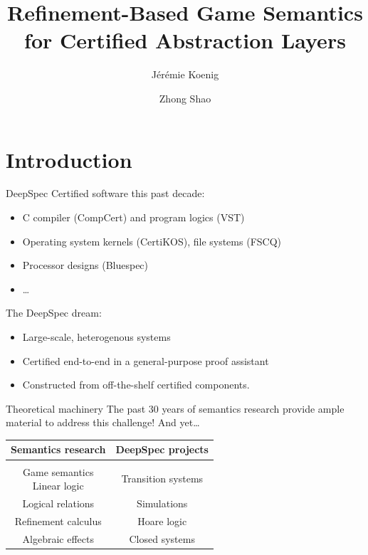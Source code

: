 \documentclass{beamer}
\title{Refinement-Based Game Semantics for
  Certified Abstraction Layers}
\author{J\'er\'emie Koenig \and Zhong Shao}
\begin{document}
\begin{frame}
\titlepage
\end{frame}

\section{Introduction} %

\begin{frame}{DeepSpec} %
  Certified software this past decade:
  \begin{itemize}
    \item C compiler (CompCert) and program logics (VST)
    \item Operating system kernels (CertiKOS), file systems (FSCQ)
    \item Processor designs (Bluespec)
    \item \ldots
  \end{itemize}

  \pause
  The DeepSpec dream:
  \begin{itemize}
    \item Large-scale, heterogenous systems
    \item Certified end-to-end in a general-purpose proof assistant
    \item Constructed from off-the-shelf certified components.
  \end{itemize}
\end{frame}

\begin{frame}{Theoretical machinery} %
  The past 30 years of semantics research
  provide ample material to address this challenge!
  And yet\ldots

  \pause
  \vfill
  \begin{centering}
    \begin{tabular}{cc}
      \hline
      Semantics research &
      DeepSpec projects
      \\
      \hline
      \\
      \pause
      \parbox{.45\textwidth}{
        \centering
        Game semantics \\ Linear logic
      } &
      \pause
      \parbox{.45\textwidth}{
        \centering
        Transition systems
      } \\[1.5em]
      \pause
      Logical relations &
      \pause
      Simulations \\[1.5em]
      \pause
      Refinement calculus &
      \pause
      Hoare logic \\[1.5em]
      \pause
      Algebraic effects &
      \pause
      Closed systems \pause \\[1.5em]
      \hline
    \end{tabular}
  \end{centering}
\end{frame}
\end{document}
